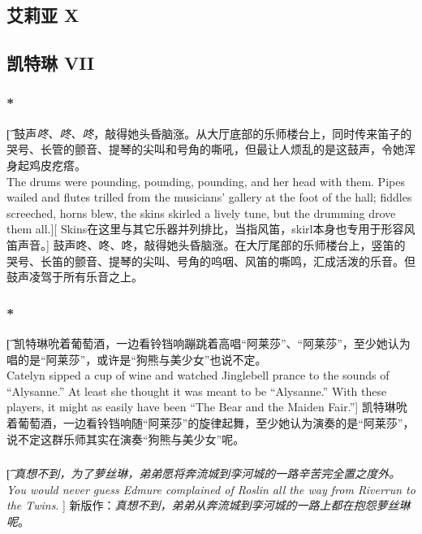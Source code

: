 \documentclass[12pt,a4paper]{article}
\begin{document}
\subsection{艾莉亚 X}

\subsection{凯特琳 VII}


\subsubsection{\color{red}*}\t[
鼓声\emph{咚、咚、咚}，敲得她头昏脑涨。从大厅底部的乐师楼台上，同时传来笛子的哭号、长管的颤音、提琴的尖叫和号角的嘶吼，但最让人烦乱的是这鼓声，令她浑身起鸡皮疙瘩。\\
The drums were pounding, pounding, pounding, and her head with them. Pipes wailed and flutes trilled from the musicians' gallery at the foot of the hall; fiddles screeched, horns blew, the skins skirled a lively tune, but the drumming drove them all.][
Skins在这里与其它乐器并列排比，当指风笛，skirl本身也专用于形容风笛声音。]
鼓声咚、咚、咚，敲得她头昏脑涨。在大厅尾部的乐师楼台上，竖笛的哭号、长笛的颤音、提琴的尖叫、号角的呜咽、风笛的嘶鸣，汇成活泼的乐音。但鼓声凌驾于所有乐音之上。


\subsubsection{\color{red}*}\t[
	凯特琳吮着葡萄酒，一边看铃铛响蹦跳着高唱“阿莱莎”、“阿莱莎”，至少她认为唱的是“阿莱莎”，或许是“狗熊与美少女”也说不定。\\
	Catelyn sipped a cup of wine and watched Jinglebell prance to the sounds of “Alysanne.” At least she thought it was meant to be “Alysanne.” With these players, it might as easily have been “The Bear and the Maiden Fair.”]
	凯特琳吮着葡萄酒，一边看铃铛响随“阿莱莎”的旋律起舞，至少她认为演奏的是“阿莱莎”，说不定这群乐师其实在演奏“狗熊与美少女”呢。
	
\subsubsection{}\t[
	\emph{真想不到，为了萝丝琳，弟弟愿将奔流城到孪河城的一路辛苦完全置之度外。\\
	You would never guess Edmure complained of Roslin all the way from Riverrun to the Twins}. ]
	新版作：\emph{真想不到，弟弟从奔流城到孪河城的一路上都在抱怨萝丝琳呢}。
	
\end{document}
